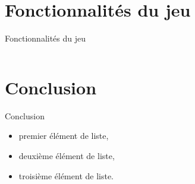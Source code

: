 \documentclass{bredelebeamer}
\begin{document}
\section{Fonctionnalités du jeu}

\begin{frame}{Fonctionnalités du jeu}

\begin{columns}

\begin{column}{0.5\textwidth}


\end{column}

\begin{column}{0.5\textwidth}



\end{column}

\end{columns}


\end{frame}



\section{Conclusion}

\begin{frame}{Conclusion}

	\begin{itemize}
		\item premier élément de liste,
		\item deuxième élément de liste,
		\item troisième élément de liste.
	\end{itemize}
\end{frame}
\end{document}
